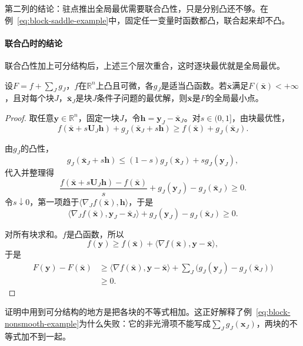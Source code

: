 第二列的结论：驻点推出全局最优需要联合凸性，只是分别凸还不够。在例~\eqref{eq:block-saddle-example}中，固定任一变量时函数都凸，联合起来却不凸。

\paragraph{联合凸时的结论}
联合凸性加上可分结构后，上述三个层次重合，这时逐块最优就是全局最优。

\begin{lemma}[联合凸时逐块最优即全局最优]
\label{lem:block-joint-convex}
设$F=f+\sum_Jg_J$，$f$在$\mathbb{R}^n$上凸且可微，各$g_J$是适当凸函数。若$\bar{\bm{x}}$满足$F(\bar{\bm{x}})<+\infty$，且对每个块$J$，$\bar{\bm{x}}_J$是块$J$条件子问题的最优解，则$\bar{\bm{x}}$是$F$的全局最小点。
\end{lemma}

\begin{proof}
取任意$\bm{y}\in\mathbb{R}^n$，固定一块$J$，令$\bm{h}=\bm{y}_J-\bar{\bm{x}}_J$。对$s\in(0,1]$，由块最优性，
\[
 f(\bar{\bm{x}}+s\bm{U}_J\bm{h})+g_J(\bar{\bm{x}}_J+s\bm{h})\geq f(\bar{\bm{x}})+g_J(\bar{\bm{x}}_J).
\]

由$g_J$的凸性，
\[
 g_J(\bar{\bm{x}}_J+s\bm{h})\leq(1-s)g_J(\bar{\bm{x}}_J)+sg_J(\bm{y}_J),
\]
代入并整理得
\[
 \frac{f(\bar{\bm{x}}+s\bm{U}_J\bm{h})-f(\bar{\bm{x}})}{s}+g_J(\bm{y}_J)-g_J(\bar{\bm{x}}_J)\geq0 .
\]
令$s\downarrow0$，第一项趋于$\langle\nabla_Jf(\bar{\bm{x}}),\bm{h}\rangle$，于是
\[
 \langle\nabla_Jf(\bar{\bm{x}}),\bm{y}_J-\bar{\bm{x}}_J\rangle+g_J(\bm{y}_J)-g_J(\bar{\bm{x}}_J)\geq0 .
\]

对所有块求和。$f$是凸函数，所以
\[
 f(\bm{y})\geq f(\bar{\bm{x}})+\langle\nabla f(\bar{\bm{x}}),\bm{y}-\bar{\bm{x}}\rangle,
\]
于是
\[
 \begin{aligned}
 F(\bm{y})-F(\bar{\bm{x}})
 &\geq\langle\nabla f(\bar{\bm{x}}),\bm{y}-\bar{\bm{x}}\rangle+\sum_J\bigl(g_J(\bm{y}_J)-g_J(\bar{\bm{x}}_J)\bigr)\\
 &\geq0 .
 \end{aligned}
\]
\end{proof}

证明中用到可分结构的地方是把各块的不等式相加。这正好解释了例~\eqref{eq:block-nonsmooth-example}为什么失败：它的非光滑项不能写成$\sum_Jg_J(\bm{x}_J)$，两块的不等式加不到一起。
